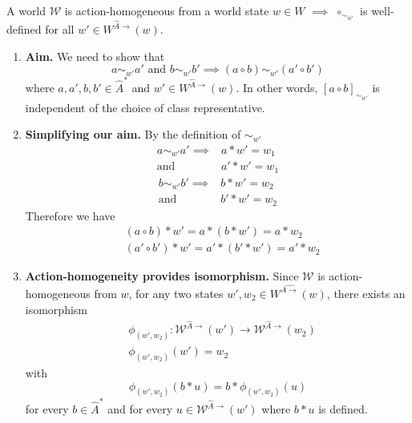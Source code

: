 \begin{propositionE}
    A world $\mathscr{W}$ is action-homogeneous from a world state $w \in W$ $\implies$ $\circ_{\sim_{w'}}$ is well-defined for all $w' \in W^{\hat{A}\to}(w)$.
\end{propositionE}
\begin{proofE}
\begin{enumerate}[(1)]
    \item \textbf{Aim.}
    We need to show that
    \begin{equation}
        a \sim_{w'} a' \text{ and } b \sim_{w'} b' \implies (a \circ b) \sim_{w'} (a' \circ b')
    \end{equation}
    where $a, a', b, b' \in \hat{A}^{*}$ and $w' \in W^{\hat{A}\to}(w)$.
    In other words, $[a \circ b]_{\sim_{w'}}$ is independent of the choice of class representative.

    \item \textbf{Simplifying our aim.}
    By the definition of $\sim_{w'}$
    \begin{equation}
    \begin{aligned}
        a \sim_{w'} a' \implies & a \ast w' = w_{1} \\
        \text{and } & a' \ast w' = w_{1}
    \end{aligned}
    \end{equation}
    \begin{equation}
    \begin{aligned}
        b \sim_{w'} b' \implies & b \ast w' = w_{2} \\
        \text{and } & b' \ast w' = w_{2}
    \end{aligned}
    \end{equation}
    Therefore we have
    \begin{align}
        & (a \circ b) \ast w' = a \ast (b \ast w') = a \ast w_{2} \\
        & (a' \circ b') \ast w' = a' \ast (b' \ast w') = a' \ast w_{2}
    \end{align}

    \item \textbf{Action-homogeneity provides isomorphism.}
    Since $\mathscr{W}$ is action-homogeneous from $w$, for any two states $w', w_{2} \in W^{\hat{A\to}}(w)$, there exists an isomorphism
    \begin{align}
        & \phi_{(w', w_{2})}: \mathscr{W}^{\hat{A}\to}(w') \to \mathscr{W}^{\hat{A}\to}(w_{2}) \\
        & \phi_{(w', w_{2})}(w') = w_{2}
    \end{align}
    with
    \begin{equation}
        \phi_{(w', w_{2})}(b \ast u) = b \ast \phi_{(w', w_{2})}(u)
    \end{equation}
    for every $b \in \hat{A}^{*}$ and for every $u \in \mathscr{W}^{\hat{A}\to}(w')$ where $b \ast u$ is defined.


\end{enumerate}
\end{proofE}
